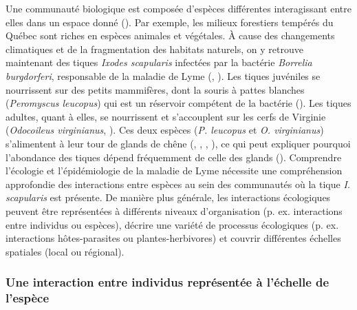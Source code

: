 Une communauté biologique est composée d'espèces différentes interagissant entre
elles dans un espace donné (\cite{Stroud2015Community}). Par exemple, les
milieux forestiers tempérés du Québec sont riches en espèces animales et
végétales. À cause des changements climatiques et de la fragmentation des
habitats naturels, on y retrouve maintenant des tiques \textit{Ixodes
scapularis} infectées par la bactérie \textit{Borrelia burgdorferi}, responsable
de la maladie de Lyme (\cite{Ogden2009Emergence}, \cite{Simon2014Climate}). Les
tiques juvéniles se nourrissent sur des petits mammifères, dont la souris à
pattes blanches (\textit{Peromyscus leucopus}) qui est un réservoir compétent de
la bactérie (\cite{Donahue1987Reservoir}). Les tiques adultes, quant à elles, se
nourrissent et s'accouplent sur les cerfs de Virginie (\textit{Odocoileus
virginianus}, \cite{Lane1991Lyme}). Ces deux espèces (\textit{P. leucopus} et
\textit{O. virginianus}) s'alimentent à leur tour de glands de chêne
(\cite{McShea1993Variablea}, \cite{Elkinton1996Interactions},
\cite{Wolff1996Population}, \cite{McShea2000Influence}), ce qui peut expliquer
pourquoi l'abondance des tiques dépend fréquemment de celle des glands
(\cite{Ostfeld2006Climate}). Comprendre l'écologie et l'épidémiologie de la
maladie de Lyme nécessite une compréhension approfondie des interactions entre
espèces au sein des communautés où la tique \textit{I. scapularis} est présente.
De manière plus générale, les interactions écologiques peuvent être représentées
à différents niveaux d'organisation (p. ex. interactions entre individus ou
espèces), décrire une variété de processus écologiques (p. ex. interactions
hôtes-parasites ou plantes-herbivores) et couvrir différentes échelles spatiales
(local ou régional).

\subsubsection{Une interaction entre individus représentée à l'échelle de l'espèce} 

